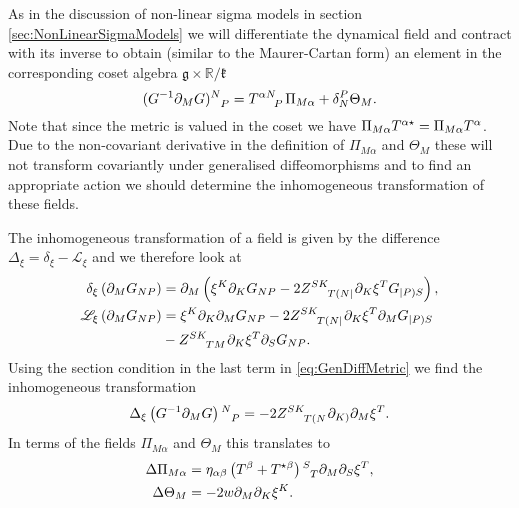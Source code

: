 As in the discussion of non-linear sigma models in section \ref{sec:NonLinearSigmaModels} we will differentiate the dynamical field and contract with its inverse to obtain (similar to the Maurer-Cartan form) an element in the corresponding coset algebra $\mathfrak{g}\times\mathbb{R}/\mathfrak{k}$
\begin{equation}
    (G^{-1}\pd_MG)\tensor{}{^N_P} = \tensor{T}{^{\alpha N}_P}\Pi_{M\alpha}+\delta^P_N\Theta_M.
\end{equation}
Note that since the metric is valued in the coset we have $\Pi_{M\alpha}\tensor{T}{^{\alpha \star}}=\Pi_{M\alpha}\tensor{T}{^{\alpha}}$. Due to the non-covariant derivative in the definition of $\Pi_{M\alpha}$ and $\Theta_M$ these will not transform covariantly under generalised diffeomorphisms and to find an appropriate action we should determine the inhomogeneous transformation of these fields. 

The inhomogeneous transformation of a field is given by the difference $\Delta_\xi = \delta_\xi-\mathscr{L}_\xi$ and we therefore look at 
\begin{align}
    \delta_\xi \left(\pd_MG_{NP}\right) &= \pd_M\left(\xi^K\pd_KG_{NP}-2\tensor{Z}{^{SK}_{T(N|}}\pd_K\xi^TG_{|P)S}\right),\\
    \mathscr{L}_\xi \left(\pd_MG_{NP}\right) &= \xi^K\pd_K\pd_MG_{NP}-2\tensor{Z}{^{SK}_{T(N|}}\pd_K\xi^T\pd_MG_{|P)S}\nonumber\\
        &-\tensor{Z}{^{SK}_{TM}}\pd_K\xi^T\pd_SG_{NP}. \label{eq:GenDiffMetric}
\end{align}
Using the section condition in the last term in \eqref{eq:GenDiffMetric} we find the inhomogeneous transformation 
\begin{equation}
    \Delta_\xi \left(G^{-1}\pd_MG\right)\tensor{}{^N_P} = -2\tensor{Z}{^{SK}_{T(N}}\pd_{K)}\pd_M\xi^T.
\end{equation}
In terms of the fields $\Pi_{M\alpha}$ and $\Theta_M$ this translates to 
\begin{align}
    \Delta \Pi_{M\alpha} &= \eta_{\alpha\beta}\left(T^\beta+T^{\star\beta}\right)\tensor{}{^S_T}\pd_M\pd_S\xi^T,\\
    \Delta \Theta_M &= -2w\pd_M\pd_K\xi^K.
\end{align}

